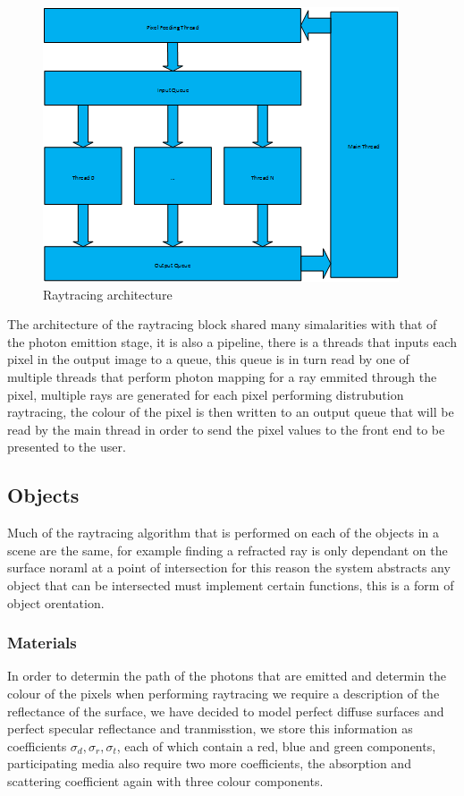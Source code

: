 \begin{figure}
\centering
\includegraphics{./images/pixel_threading.png}
\caption{Raytracing architecture}
\label{fig:pixel_generation}
\end{figure}

The architecture of the raytracing block shared many simalarities with that of the photon emittion stage,
it is also a pipeline, there is a threads that inputs each pixel in the output image to a queue, this queue
is in turn read by one of multiple threads that perform photon mapping for a ray emmited through the pixel,
multiple rays are generated for each pixel performing distrubution raytracing, the colour of the pixel is
then written to an output queue that will be read by the main thread in order to send the pixel values to
the front end to be presented to the user.

\subsection{Objects}
Much of the raytracing algorithm that is performed on each of the
objects in a scene are the same, for example finding a refracted
ray is only dependant on the surface noraml at a point of intersection
for this reason the system abstracts any object that can be intersected
must implement certain functions, this is a form of object orentation.

\subsubsection{Materials}
In order to determin the path of the photons that are emitted and determin the colour of the pixels when
performing raytracing we require a description of the reflectance of the surface, we have decided to model
perfect diffuse surfaces and perfect specular reflectance and tranmisstion, we store this information
as coefficients $\sigma_d, \sigma_r, \sigma_t$, each of which contain a red, blue and green components, 
participating media also require two more coefficients, the absorption and scattering coefficient again
with three colour components.

